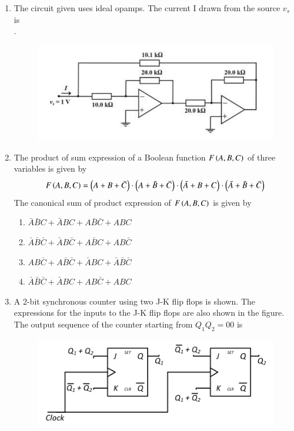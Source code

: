 \documentclass[journal,12pt,onecolumn]{IEEEtran}
\theoremstyle{remark}
\begin{document}
\begin{enumerate}
    \hfill{}

    \item The circuit given uses ideal opamps. The current I  drawn from the source $v_s$ is \\  \underline{\hspace{2cm}}.
    \begin{figure}[H]
        \centering
        \includegraphics[width=0.5\columnwidth]{q42.png}
        \caption*{}
        \label{fig:q42}
    \end{figure}
    
    \hfill{}

    \item The product of sum expression of a Boolean function $F\left(A, B, C\right)$ of three variables is given by
    \begin{align*}
    F\left(A, B, C\right) = \left( A + B + \bar{C} \right) \cdot \left(A + \bar{B} + \bar{C} \right) \cdot \left( \bar{A} + B + C \right) \cdot \left( \bar{A} + \bar{B} + \bar{C} \right)
    \end{align*}
    The canonical sum of product expression of $F\left(A, B, C\right)$ is given by
    
    \hfill{}
    \begin{enumerate}
        \item $\bar{A}\bar{B}C + \bar{A}B C + A\bar{B}\bar{C} + A B C$
        \item $\bar{A}\bar{B}\bar{C} + \bar{A}B\bar{C} + A\bar{B}C + AB\bar{C}$
        \item $A B \bar{C} + A \bar{B} \bar{C} + \bar{A} B C + \bar{A} \bar{B} \bar{C}$
        \item $\bar{A}\bar{B}\bar{C} + \bar{A}B C + A B \bar{C} + A B C$
    \end{enumerate}

    \item A 2-bit synchronous counter using two J-K flip flops is shown. The expressions for the inputs to the J-K flip flops are also shown in the figure. The output sequence of the counter starting from $Q_1Q_2 = 00$ is
    \begin{figure}[H]
        \centering
        \includegraphics[width=0.6\columnwidth]{q44.png}
        \caption*{}
        \label{fig:q44}
    \end{figure}
    

\end{enumerate}
\end{document}

